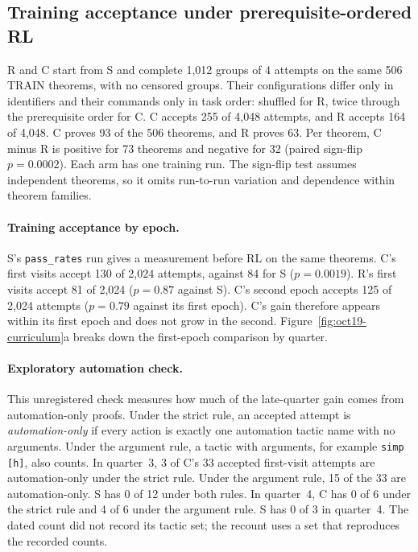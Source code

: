 \documentclass[11pt]{article}
\newcommand{\code}[1]{\texttt{#1}}
\begin{document}
\subsection{Training acceptance under prerequisite-ordered RL}
\label{sec:oct19-curriculum}

R and C start from S and complete 1,012 groups of 4 attempts on the same 506 TRAIN theorems, with no censored groups.
Their configurations differ only in identifiers and their commands only in task order: shuffled for R, twice through the prerequisite order for C.
C accepts 255 of 4,048 attempts, and R accepts 164 of 4,048.
C proves 93 of the 506 theorems, and R proves 63.
Per theorem, C minus R is positive for 73 theorems and negative for 32 (paired sign-flip $p = 0.0002$).
Each arm has one training run.
The sign-flip test assumes independent theorems, so it omits run-to-run variation and dependence within theorem families.

\paragraph{Training acceptance by epoch.}
S's \code{pass\_rates} run gives a measurement before RL on the same theorems.
C's first visits accept 130 of 2,024 attempts, against 84 for S ($p = 0.0019$).
R's first visits accept 81 of 2,024 ($p = 0.87$ against S).
C's second epoch accepts 125 of 2,024 attempts ($p = 0.79$ against its first epoch).
C's gain therefore appears within its first epoch and does not grow in the second.
Figure~\ref{fig:oct19-curriculum}a breaks down the first-epoch comparison by quarter.

\paragraph{Exploratory automation check.}
This unregistered check measures how much of the late-quarter gain comes from automation-only proofs.
Under the strict rule, an accepted attempt is \emph{automation-only} if every action is exactly one automation tactic name with no arguments.
Under the argument rule, a tactic with arguments, for example \code{simp [h]}, also counts.
In quarter~3, 3 of C's 33 accepted first-visit attempts are automation-only under the strict rule.
Under the argument rule, 15 of the 33 are automation-only.
S has 0 of 12 under both rules.
In quarter~4, C has 0 of 6 under the strict rule and 4 of 6 under the argument rule.
S has 0 of 3 in quarter~4.
The dated count did not record its tactic set; the recount uses a set that reproduces the recorded counts.
\end{document}
